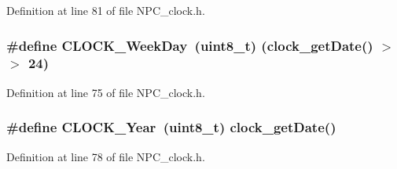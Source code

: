 Definition at line 81 of file N\+P\+C\+\_\+clock.\+h.

\subsubsection[{\texorpdfstring{C\+L\+O\+C\+K\+\_\+\+Week\+Day}{CLOCK_WeekDay}}]{\setlength{\rightskip}{0pt plus 5cm}\#define C\+L\+O\+C\+K\+\_\+\+Week\+Day~(uint8\+\_\+t) ({\bf clock\+\_\+get\+Date}() $>$$>$ 24)}\hypertarget{group___c_l_o_c_k___value_ga41cab09c59fe3cc9a25719ec3be3fd4d}{}\label{group___c_l_o_c_k___value_ga41cab09c59fe3cc9a25719ec3be3fd4d}


Definition at line 75 of file N\+P\+C\+\_\+clock.\+h.

\subsubsection[{\texorpdfstring{C\+L\+O\+C\+K\+\_\+\+Year}{CLOCK_Year}}]{\setlength{\rightskip}{0pt plus 5cm}\#define C\+L\+O\+C\+K\+\_\+\+Year~(uint8\+\_\+t) {\bf clock\+\_\+get\+Date}()}\hypertarget{group___c_l_o_c_k___value_ga35866274a21e8d3c0223c465209f3d74}{}\label{group___c_l_o_c_k___value_ga35866274a21e8d3c0223c465209f3d74}


Definition at line 78 of file N\+P\+C\+\_\+clock.\+h.

